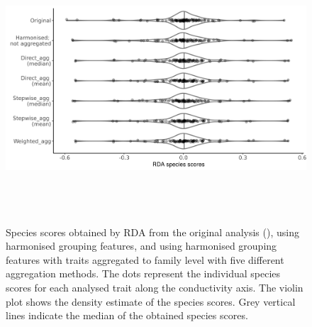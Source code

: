 \documentclass[12pt]{article}
\begin{document}
\begin{figure}[H]
    \centering
    \includegraphics[width=16.5cm, height=10cm]{Species_scores_rda.png}
    \caption{Species scores obtained by RDA from the original analysis (\cite{szocs_effects_2014}), using harmonised grouping features, and using harmonised grouping features with traits aggregated to family level with five different aggregation methods. The dots represent the individual species scores for each analysed trait along the conductivity axis. The violin plot shows the density estimate of the species scores. Grey vertical lines indicate the median of the obtained species scores.}
    \label{fig:violin_plot_species_sc}
\end{figure}
\end{document}
